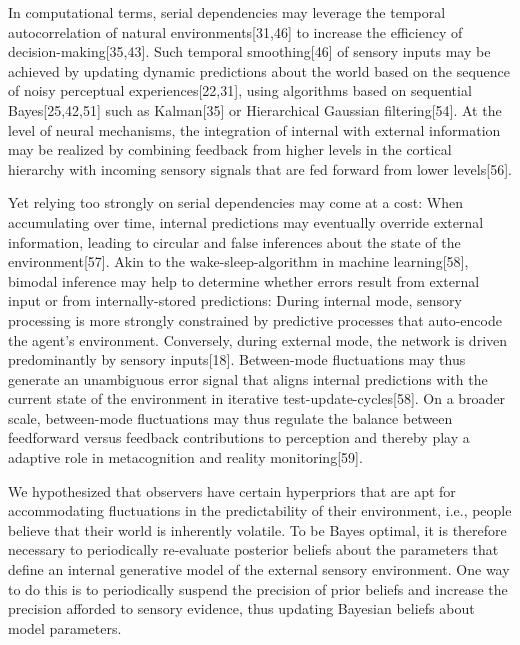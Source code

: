\documentclass[
]{article}
\begin{document}
In computational terms, serial dependencies may leverage the temporal
autocorrelation of natural environments{[}31,46{]} to increase the
efficiency of decision-making{[}35,43{]}. Such temporal
smoothing{[}46{]} of sensory inputs may be achieved by updating dynamic
predictions about the world based on the sequence of noisy perceptual
experiences{[}22,31{]}, using algorithms based on sequential
Bayes{[}25,42,51{]} such as Kalman{[}35{]} or Hierarchical Gaussian
filtering{[}54{]}. At the level of neural mechanisms, the integration of
internal with external information may be realized by combining feedback
from higher levels in the cortical hierarchy with incoming sensory
signals that are fed forward from lower levels{[}56{]}.

Yet relying too strongly on serial dependencies may come at a cost: When
accumulating over time, internal predictions may eventually override
external information, leading to circular and false inferences about the
state of the environment{[}57{]}. Akin to the wake-sleep-algorithm in
machine learning{[}58{]}, bimodal inference may help to determine
whether errors result from external input or from internally-stored
predictions: During internal mode, sensory processing is more strongly
constrained by predictive processes that auto-encode the agent's
environment. Conversely, during external mode, the network is driven
predominantly by sensory inputs{[}18{]}. Between-mode fluctuations may
thus generate an unambiguous error signal that aligns internal
predictions with the current state of the environment in iterative
test-update-cycles{[}58{]}. On a broader scale, between-mode
fluctuations may thus regulate the balance between feedforward versus
feedback contributions to perception and thereby play a adaptive role in
metacognition and reality monitoring{[}59{]}.

We hypothesized that observers have certain hyperpriors that are apt for
accommodating fluctuations in the predictability of their environment,
i.e., people believe that their world is inherently volatile. To be
Bayes optimal, it is therefore necessary to periodically re-evaluate
posterior beliefs about the parameters that define an internal
generative model of the external sensory environment. One way to do this
is to periodically suspend the precision of prior beliefs and increase
the precision afforded to sensory evidence, thus updating Bayesian
beliefs about model parameters.
\end{document}
